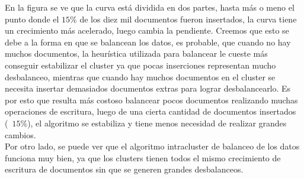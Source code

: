 En la figura se ve que la curva está dividida en dos partes, hasta más o meno el punto donde el $15\%$ de los diez mil documentos fueron insertados, la curva tiene un crecimiento más acelerado, luego cambia la pendiente. Creemos que esto se debe a la forma en que se balancean los datos, es probable, que cuando no hay muchos documentos, la heurística utilizada para balancear le cueste más conseguir estabilizar el cluster ya que pocas inserciones representan mucho desbalanceo, mientras que cuando hay muchos documentos en el cluster se necesita insertar demasiados documentos extras para lograr desbalancearlo. Es por esto que resulta más costoso balancear pocos documentos realizando muchas operaciones de escritura, luego de una cierta cantidad de documentos insertados (~$15\%$), el algoritmo se estabiliza y tiene menos necesidad de realizar grandes cambios. \\

Por otro lado, se puede ver que el algoritmo intracluster de balanceo de los datos funciona muy bien, ya que los clusters tienen todos el mismo crecimiento de escritura de documentos sin que se generen grandes desbalanceos. \\